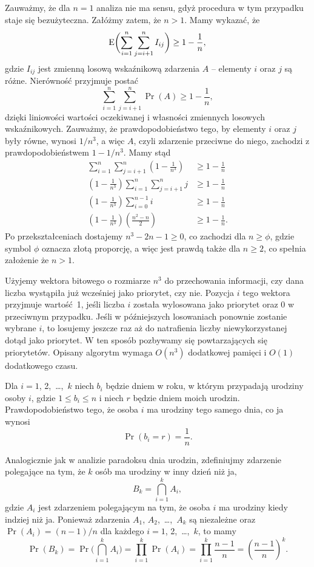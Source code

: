 \exercise{} %
Zauważmy, że dla $n=1$ analiza nie ma sensu, gdyż procedura  w tym przypadku staje się bezużyteczna. Załóżmy zatem, że $n>1$. Mamy wykazać, że
\[
	\operatorname{E}\biggl(\sum_{i=1}^n\sum_{j=i+1}^nI_{ij}\biggr) \ge 1-\frac{1}{n},
\]
gdzie $I_{ij}$ jest zmienną losową wskaźnikową zdarzenia $A$ -- elementy $i$ oraz $j$ są różne. Nierówność przyjmuje postać
\[
	\sum_{i=1}^n\sum_{j=i+1}^n\Pr(A) \ge 1-\frac{1}{n},
\]
dzięki liniowości wartości oczekiwanej i własności zmiennych losowych wskaźnikowych. Zauważmy, że prawdopodobieństwo tego, by elementy $i$ oraz $j$ były równe, wynosi $1/n^3$, a więc $A$, czyli zdarzenie przeciwne do niego, zachodzi z prawdopodobieństwem $1-1/n^3$. Mamy stąd
\begin{align*}
	\sum_{i=1}^n\sum_{j=i+1}^n\left(1-\frac{1}{n^3}\right) &\ge 1-\frac{1}{n} \\
	\left(1-\frac{1}{n^3}\right)\sum_{i=1}^n\sum_{j=i+1}^nj &\ge 1-\frac{1}{n} \\
	\left(1-\frac{1}{n^3}\right)\sum_{i=0}^{n-1}i &\ge 1-\frac{1}{n} \\
	\left(1-\frac{1}{n^3}\right)\left(\frac{n^2-n}{2}\right) &\ge 1-\frac{1}{n}.
\end{align*}
Po przekształceniach dostajemy $n^3-2n-1\ge0$, co zachodzi dla $n\ge\phi$, gdzie symbol $\phi$ oznacza złotą proporcję, a więc jest prawdą także dla $n\ge2$, co spełnia założenie że $n>1$.

\exercise{} %
Użyjemy wektora bitowego o rozmiarze $n^3$ do przechowania informacji, czy dana liczba wystąpiła już wcześniej jako priorytet, czy nie. Pozycja $i$ tego wektora przyjmuje wartość~1, jeśli liczba $i$ została wylosowana jako priorytet oraz 0 w przeciwnym przypadku. Jeśli w późniejszych losowaniach ponownie zostanie wybrane $i$, to losujemy jeszcze raz aż do natrafienia liczby niewykorzystanej dotąd jako priorytet. W ten sposób pozbywamy się powtarzających się priorytetów. Opisany algorytm wymaga $O(n^3)$ dodatkowej pamięci i $O(1)$ dodatkowego czasu.


\exercise{} %
Dla $i=1$, 2,~\dots,~$k$ niech $b_i$ będzie dniem w roku, w którym przypadają urodziny osoby $i$, gdzie $1\le b_i\le n$ i niech $r$ będzie dniem moich urodzin. Prawdopodobieństwo tego, że osoba $i$ ma urodziny tego samego dnia, co ja wynosi
\[
	\Pr(b_i=r) = \frac{1}{n}.
\]

Analogicznie jak w analizie paradoksu dnia urodzin, zdefiniujmy zdarzenie polegające na tym, że $k$ osób ma urodziny w inny dzień niż ja,
\[
	B_k = \bigcap_{i=1}^kA_i,
\]
gdzie $A_i$ jest zdarzeniem polegającym na tym, że osoba $i$ ma urodziny kiedy indziej niż ja. Ponieważ zdarzenia $A_1$, $A_2$,~\dots,~$A_k$ są niezależne oraz $\Pr(A_i)=(n-1)/n$ dla każdego $i=1$, 2,~\dots,~$k$, to mamy
\[
	\Pr(B_k) = \Pr\biggl(\bigcap_{i=1}^kA_i\biggr) = \prod_{i=1}^k\Pr(A_i) = \prod_{i=1}^k\frac{n-1}{n} = \left(\frac{n-1}{n}\right)^k.
\]


